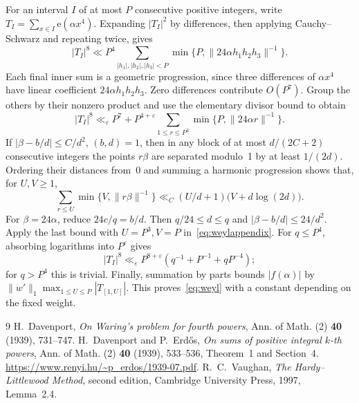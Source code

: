 \documentclass[11pt]{article}
\theoremstyle{remark}\newtheorem*{remark}{Remark}
\newcommand{\e}{\mathrm e}
\newcommand{\eps}{\varepsilon}
\begin{document}
For an interval \(I\) of at most \(P\) consecutive positive integers,
write \(T_I=\sum_{x\in I}\e(\alpha x^4)\).
Expanding \(|T_I|^2\) by differences, then applying Cauchy--Schwarz
and repeating twice, gives
\[
 |T_I|^8\ll P^4\sum_{|h_1|,|h_2|,|h_3|<P}
 \min\{P,\|24\alpha h_1h_2h_3\|^{-1}\}.
\]
Each final inner sum is a geometric progression, since three differences
of \(\alpha x^4\) have linear coefficient \(24\alpha h_1h_2h_3\).
Zero differences contribute \(O(P^7)\). Group the others by their
nonzero product and use the elementary divisor bound to obtain
\begin{equation}\label{eq:weylappendix}
 |T_I|^8\ll_\eps P^7+P^{4+\eps}
 \sum_{1\le r\le P^3}\min\{P,\|24\alpha r\|^{-1}\}.
\end{equation}
If \(|\beta-b/d|\le C/d^2\), \((b,d)=1\), then in any block of
at most \(d/(2C+2)\) consecutive integers the points \(r\beta\)
are separated modulo~1 by at least \(1/(2d)\). Ordering their distances
from~0 and summing a harmonic progression shows that, for \(U,V\ge1\),
\[
 \sum_{r\le U}\min\{V,\|r\beta\|^{-1}\}
 \ll_C (U/d+1)\bigl(V+d\log(2d)\bigr).
\]
For \(\beta=24\alpha\), reduce \(24c/q=b/d\). Then
\(q/24\le d\le q\) and \(|\beta-b/d|\le24/d^2\).
Apply the last bound with \(U=P^3,V=P\) in~\eqref{eq:weylappendix}.
For \(q\le P^4\), absorbing logarithms into \(P^\eps\) gives
\[
 |T_I|^8\ll_\eps P^{8+\eps}
 (q^{-1}+P^{-1}+qP^{-4});
\]
for \(q>P^4\) this is trivial. Finally, summation by parts bounds
\(|f(\alpha)|\) by \(\|w'\|_1\max_{1\le U\le P}|T_{[1,U]}|\).
This proves~\eqref{eq:weyl} with a constant depending on the fixed weight.

\begin{thebibliography}{9}
H.~Davenport, \emph{On Waring's problem for fourth powers},
Ann. of Math. (2) \textbf{40} (1939), 731--747.
H.~Davenport and P.~Erd\H os, \emph{On sums of positive integral
\(k\)-th powers}, Ann. of Math. (2) \textbf{40} (1939), 533--536,
Theorem~1 and Section~4.
\url{https://www.renyi.hu/~p_erdos/1939-07.pdf}.
R.~C.~Vaughan, \emph{The Hardy--Littlewood Method}, second edition,
Cambridge University Press, 1997, Lemma~2.4.
\end{thebibliography}
\end{document}
